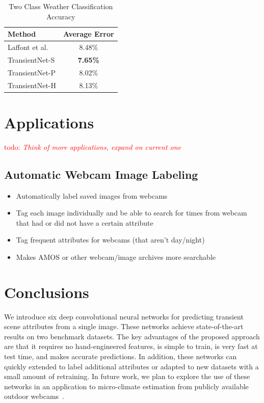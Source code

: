 \documentclass{article}
\newcommand{\todo}[1]{\textcolor{red}{todo: {\em #1}}}
\begin{document}
\begin{table}[t]
	\centering
	\begin{tabular}{ | l | c | }
		\hline
			Method & Average Error \\ \hline
			Laffont et al.~\cite{Laffont14}& 8.48\% \\ \hline
			TransientNet-S & \textbf{7.65\%} \\ \hline
			TransientNet-P & 8.02\% \\ \hline
			TransientNet-H & 8.13\% \\ 
		\hline
	\end{tabular}
	\caption{Two Class Weather Classification Accuracy}
	\label{tbl:transient}
\end{table}

\section{Applications}
\todo{Think of more applications, expand on current one}
\subsection{Automatic Webcam Image Labeling}

\begin{itemize}

	\item Automatically label saved images from webcams
	\item Tag each image individually and be able to search for times from
			  webcam that had or did not have a certain attribute
	\item Tag frequent attributes for webcams (that aren't day/night)
	\item Makes AMOS or other webcam/image archives more searchable

\end{itemize}


\section{Conclusions}

We introduce six deep convolutional neural networks for predicting
transient scene attributes from a single image. These networks achieve
state-of-the-art results on two benchmark datasets. The key advantages
of the proposed approach are that it requires no hand-engineered
features, is simple to train, is very fast at test time, and makes
accurate predictions. In addition, these networks can quickly extended
to label additional attributes or adapted to new datasets with a small
amount of retraining. In future work, we plan to explore the use of
these networks in an application to micro-climate estimation from
publicly available outdoor webcams~\cite{islam13webcamweather}. 



\end{document}
